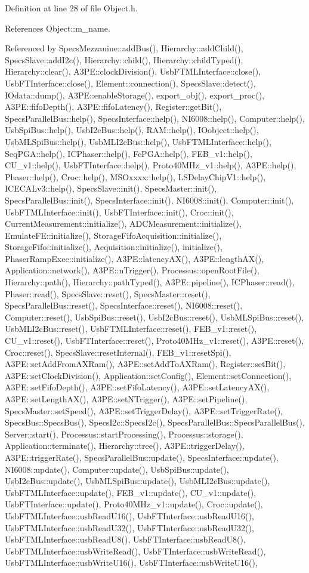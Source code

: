 Definition at line 28 of file Object.h.

References Object::m\_\-name.

Referenced by SpecsMezzanine::addBus(), Hierarchy::addChild(), SpecsSlave::addI2c(), Hierarchy::child(), Hierarchy::childTyped(), Hierarchy::clear(), A3PE::clockDivision(), UsbFTMLInterface::close(), UsbFTInterface::close(), Element::connection(), SpecsSlave::detect(), IOdata::dump(), A3PE::enableStorage(), export\_\-obj(), export\_\-proc(), A3PE::fifoDepth(), A3PE::fifoLatency(), Register::getBit(), SpecsParallelBus::help(), SpecsInterface::help(), NI6008::help(), Computer::help(), UsbSpiBus::help(), UsbI2cBus::help(), RAM::help(), IOobject::help(), UsbMLSpiBus::help(), UsbMLI2cBus::help(), UsbFTMLInterface::help(), SeqPGA::help(), ICPhaser::help(), FePGA::help(), FEB\_\-v1::help(), CU\_\-v1::help(), UsbFTInterface::help(), Proto40MHz\_\-v1::help(), A3PE::help(), Phaser::help(), Croc::help(), MSOxxxx::help(), LSDelayChipV1::help(), ICECALv3::help(), SpecsSlave::init(), SpecsMaster::init(), SpecsParallelBus::init(), SpecsInterface::init(), NI6008::init(), Computer::init(), UsbFTMLInterface::init(), UsbFTInterface::init(), Croc::init(), CurrentMeasurement::initialize(), ADCMeasurement::initialize(), EmulateFE::initialize(), StorageFifoAcquisition::initialize(), StorageFifo::initialize(), Acquisition::initialize(), initialize(), PhaserRampExec::initialize(), A3PE::latencyAX(), A3PE::lengthAX(), Application::network(), A3PE::nTrigger(), Processus::openRootFile(), Hierarchy::path(), Hierarchy::pathTyped(), A3PE::pipeline(), ICPhaser::read(), Phaser::read(), SpecsSlave::reset(), SpecsMaster::reset(), SpecsParallelBus::reset(), SpecsInterface::reset(), NI6008::reset(), Computer::reset(), UsbSpiBus::reset(), UsbI2cBus::reset(), UsbMLSpiBus::reset(), UsbMLI2cBus::reset(), UsbFTMLInterface::reset(), FEB\_\-v1::reset(), CU\_\-v1::reset(), UsbFTInterface::reset(), Proto40MHz\_\-v1::reset(), A3PE::reset(), Croc::reset(), SpecsSlave::resetInternal(), FEB\_\-v1::resetSpi(), A3PE::setAddFromAXRam(), A3PE::setAddToAXRam(), Register::setBit(), A3PE::setClockDivision(), Application::setConfig(), Element::setConnection(), A3PE::setFifoDepth(), A3PE::setFifoLatency(), A3PE::setLatencyAX(), A3PE::setLengthAX(), A3PE::setNTrigger(), A3PE::setPipeline(), SpecsMaster::setSpeed(), A3PE::setTriggerDelay(), A3PE::setTriggerRate(), SpecsBus::SpecsBus(), SpecsI2c::SpecsI2c(), SpecsParallelBus::SpecsParallelBus(), Server::start(), Processus::startProcessing(), Processus::storage(), Application::terminate(), Hierarchy::tree(), A3PE::triggerDelay(), A3PE::triggerRate(), SpecsParallelBus::update(), SpecsInterface::update(), NI6008::update(), Computer::update(), UsbSpiBus::update(), UsbI2cBus::update(), UsbMLSpiBus::update(), UsbMLI2cBus::update(), UsbFTMLInterface::update(), FEB\_\-v1::update(), CU\_\-v1::update(), UsbFTInterface::update(), Proto40MHz\_\-v1::update(), Croc::update(), UsbFTMLInterface::usbReadU16(), UsbFTInterface::usbReadU16(), UsbFTMLInterface::usbReadU32(), UsbFTInterface::usbReadU32(), UsbFTMLInterface::usbReadU8(), UsbFTInterface::usbReadU8(), UsbFTMLInterface::usbWriteRead(), UsbFTInterface::usbWriteRead(), UsbFTMLInterface::usbWriteU16(), UsbFTInterface::usbWriteU16(), 